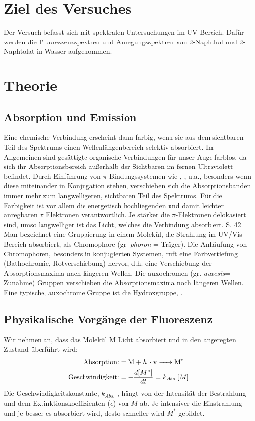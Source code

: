 \documentclass[12pt]{article}
\begin{document}
\section{Ziel des Versuches}
Der Versuch befasst sich mit spektralen Untersuchungen im UV-Bereich. Dafür werden die Fluoreszenzspektren und Anregungsspektren von 2-Naphthol und 2-Naphtolat in Wasser aufgenommen.
\section {Theorie}
\subsection{Absorption und Emission\supercite{og}}
Eine chemische Verbindung erscheint dann farbig, wenn sie aus dem sichtbaren Teil des Spektrums einen Wellenlängenbereich selektiv absorbiert.
Im Allgemeinen sind gesättigte organische Verbindungen für unser Auge farblos, da sich ihr Absorptionsbereich außerhalb der Sichtbaren im fernen Ultraviolett
befindet. Durch Einführung von $\pi$-Bindungssystemen wie , ,  u.a., besonders wenn diese miteinander in Konjugation stehen, verschieben sich
die Absorptionsbanden immer mehr zum langwelligeren, sichtbaren Teil des Spektrums.
Für die Farbigkeit ist vor allem die energetisch hochliegenden und damit leichter anregbaren $\pi$ Elektronen verantwortlich.
Je stärker die $\pi$-Elektronen delokasiert sind, umso langwelliger ist das Licht, welches die Verbindung absorbiert. S. 42
Man bezeichnet eine Gruppierung in einem Molekül, die Strahlung im UV/Vis Bereich absorbiert, als Chromophore (gr. \textit{phoron} = Träger). Die Anhäufung von Chromophoren,
besonders in konjugierten Systemen, ruft eine Farbvertiefung (Bathochromie, Rotverschiebung) hervor, d.h. eine Verschiebung der Absorptionsmaxima nach längeren Wellen.
Die auxochromen (gr. \textit{auxesis}= Zunahme) Gruppen verschieben die Absorptionsmaxima noch längeren Wellen. Eine typische, auxochrome Gruppe ist die Hydroxgruppe, .
\subsection{Physikalische Vorgänge der Fluoreszenz\supercite{harris}}
Wir nehmen an, dass das Molekül M Licht absorbiert und in den angeregten Zustand 
überführt wird:
\begin{align*}
 \text{Absorption:} &= \ce{M + h \cdot v -> M^*}\\
 \text{Geschwindigkeit:} &= - \frac{d[M^*]}{dt} = k _{Abs.} [M]
\end{align*}
Die Geschwindigkeitskonstante, $k_{Abs.}$ , hängt von der Intensität der Bestrahlung und
dem Extinktionskoeffizienten ($\epsilon$) von $M$ ab. Je intensiver die Einstrahlung und je besser es
absorbiert wird, desto schneller wird $M^*$ gebildet.
\end{document}
